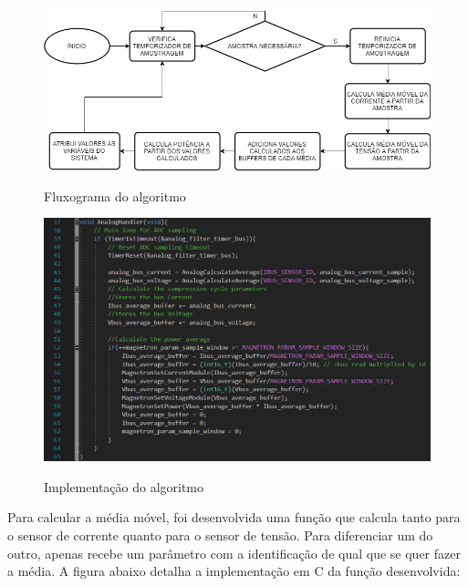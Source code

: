 \begin{figure}[H]
    \centering
    \caption{Fluxograma do algoritmo}
    \includegraphics[width=1\textwidth]{./dados/figuras/flow_ad}
    \label{fig:figura-func_analog}
\end{figure}


\begin{figure}[H]
    \centering
    \caption{Implementação do algoritmo}
    \includegraphics[width=1\textwidth]{./dados/figuras/func_analog}
    \label{fig:figura-func_analog}
\end{figure}



Para calcular a média móvel, foi desenvolvida uma função que calcula tanto para o sensor de corrente quanto para o sensor de tensão. Para diferenciar um do outro, apenas recebe um parâmetro com a identificação de qual que se quer fazer a média. A figura abaixo detalha a implementação em C da função desenvolvida:

